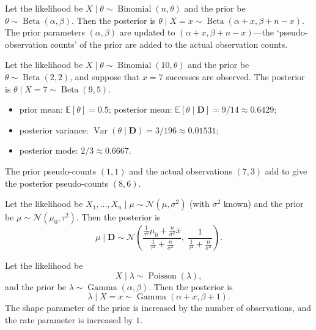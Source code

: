 \begin{example}\label{ex:beta_binomial}
Let the likelihood be $X \mid \theta \sim \operatorname{Binomial}(n, \theta)$ and the prior be $\theta \sim \operatorname{Beta}(\alpha, \beta)$. Then the posterior is $\theta \mid X = x \sim \operatorname{Beta}(\alpha + x, \beta + n - x)$. The prior parameters $(\alpha, \beta)$ are updated to $(\alpha + x, \beta + n - x)$---the `pseudo-observation counts' of the prior are added to the actual observation counts.
\end{example}

\begin{example}\label{ch14_beta_binomial_numeric}
Let the likelihood be $X \mid \theta \sim \operatorname{Binomial}(10, \theta)$ and the prior be $\theta \sim \operatorname{Beta}(2, 2)$, and suppose that $x = 7$ successes are observed. The posterior is $\theta \mid X = 7 \sim \operatorname{Beta}(9, 5)$.
\begin{itemize}
    \item prior mean: $\mathbb{E}[\theta] = 0.5$; posterior mean: $\mathbb{E}[\theta \mid \mathbf{D}] = 9/14 \approx 0.6429$;
    \item posterior variance: $\operatorname{Var}(\theta \mid \mathbf{D}) = 3/196 \approx 0.01531$;
    \item posterior mode: $2/3 \approx 0.6667$.
\end{itemize}
The prior pseudo-counts $(1, 1)$ and the actual observations $(7, 3)$ add to give the posterior pseudo-counts $(8, 6)$.
\end{example}

\begin{example}\label{ex:normal_normal}
Let the likelihood be $X_1, \dots, X_n \mid \mu \sim \mathcal{N}(\mu, \sigma^2)$ (with $\sigma^2$ known) and the prior be $\mu \sim \mathcal{N}(\mu_0, \tau^2)$. Then the posterior is
\[
\mu \mid \mathbf{D} \sim \mathcal{N}\left( \frac{\frac{1}{\tau^2}\mu_0 + \frac{n}{\sigma^2}\bar{x}}{\frac{1}{\tau^2} + \frac{n}{\sigma^2}}, \; \frac{1}{\frac{1}{\tau^2} + \frac{n}{\sigma^2}} \right).
\]
\end{example}

\begin{example}
\label{ex:gamma_poisson}
Let the likelihood be
\[
X \mid \lambda \sim \operatorname{Poisson}(\lambda),
\]
and the prior be $\lambda \sim \operatorname{Gamma}(\alpha, \beta)$.
Then the posterior is
\[
\lambda \mid X = x \sim \operatorname{Gamma}(\alpha + x, \beta + 1).
\]
The shape parameter of the prior is increased by the number of observations, and the rate parameter is increased by $1$.
\end{example}

